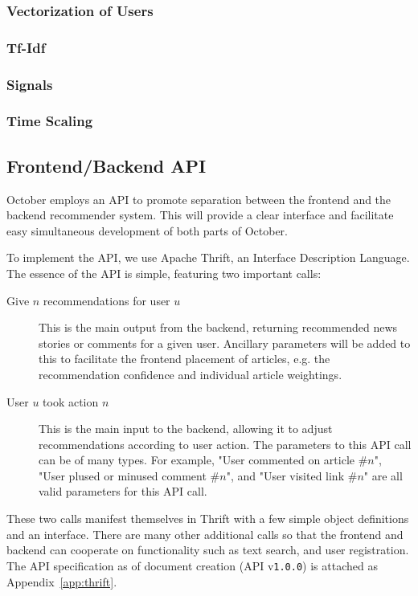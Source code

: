 \documentclass[11pt,letterpaper,titlepage]{article}
\begin{document}
\subsubsection{Vectorization of Users}
\subsubsection{Tf-Idf}
\subsubsection{Signals}
\subsubsection{Time Scaling}

\subsection{Frontend/Backend API}
\label{sec:api}
October employs an API to promote separation between the frontend and the backend recommender system.
This will provide a clear interface and facilitate easy simultaneous development of both parts of October.

To implement the API, we use Apache Thrift, an Interface Description Language\cite{thrift}.
The essence of the API is simple, featuring two important calls:
\begin{description}
\item[Give $n$ recommendations for user $u$]
This is the main output from the backend, returning recommended news stories or comments for a given user.
Ancillary parameters will be added to this to facilitate the frontend placement of articles, e.g. the recommendation confidence and individual article weightings.
\item[User $u$ took action $n$]
This is the main input to the backend, allowing it to adjust recommendations according to user action.
The parameters to this API call can be of many types. For example, "User commented on article \#$n$", "User plused or minused comment \#$n$", and "User visited link \#$n$" are all valid parameters for this API call.
\end{description}

These two calls manifest themselves in Thrift with a few simple object definitions and an interface.
There are many other additional calls so that the frontend and backend can cooperate on functionality such as text search, and user registration.
The API specification as of document creation (API v\texttt{1.0.0}) is attached as Appendix~\ref{app:thrift}.
\end{document}
